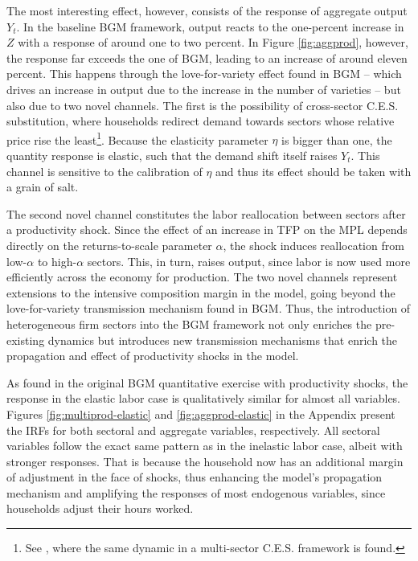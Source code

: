 \documentclass[a4paper,12pt]{article} %
\numberwithin{equation}{section} %
\numberwithin{figure}{section}
\numberwithin{table}{section}
\begin{document}
The most interesting effect, however, consists of the response of aggregate
output $Y_t$. In the baseline BGM framework, output reacts to the one-percent increase in $Z$ with a response of 
around one to two percent. In Figure \ref{fig:aggprod}, however, the response far exceeds the one of BGM, leading to an increase of
around eleven percent. This happens through the love-for-variety effect found in BGM -- which drives an increase
in output due to the increase in the number of varieties -- but also due to two novel channels. The first is the possibility of cross-sector
C.E.S. substitution, where households redirect demand towards sectors whose relative price rise the least\footnote{See \textcite{gouel2023love}, 
where the same dynamic in a multi-sector C.E.S. framework is found.}. Because the elasticity parameter
$\eta$ is bigger than one, the quantity response is elastic, such that the demand shift itself raises $Y_t$. This channel is sensitive to
the calibration of $\eta$ and thus its effect should be taken with a grain of salt.

The second novel channel constitutes the labor reallocation between sectors after a productivity shock. Since the effect of an increase in
TFP on the MPL depends directly on the returns-to-scale parameter $\alpha$, the shock induces 
reallocation from low-$\alpha$ to high-$\alpha$ sectors. This, in turn, raises output, since labor is now used more efficiently across 
the economy for production. The two novel channels represent extensions to the intensive composition margin in the model, 
going beyond the love-for-variety transmission mechanism found in BGM. Thus, the introduction
of heterogeneous firm sectors into the BGM framework not only enriches the pre-existing dynamics but introduces new transmission mechanisms
that enrich the propagation and effect of productivity shocks in the model.

As found in the original BGM quantitative exercise with productivity shocks, the response in the elastic labor case is 
qualitatively similar for almost all variables. Figures \ref{fig:multiprod-elastic} and \ref{fig:aggprod-elastic} in the Appendix present the IRFs for both
sectoral and aggregate variables, respectively. All sectoral variables follow the exact same pattern as in the inelastic labor case, albeit 
with stronger responses. That is because the household now has an additional margin of adjustment in the face of shocks, thus enhancing the model's 
propagation mechanism and amplifying the responses of most endogenous variables, since households adjust their hours worked. 
\end{document}
